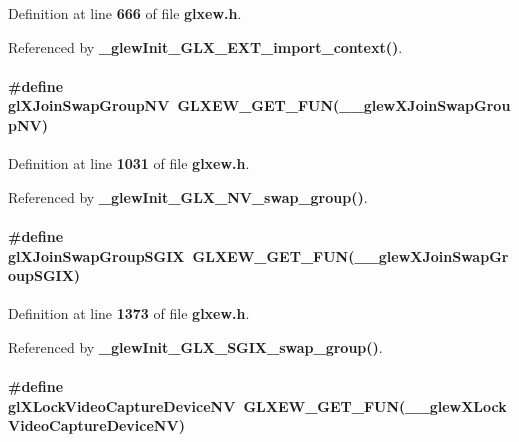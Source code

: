 Definition at line {\bf 666} of file {\bf glxew.\+h}.



Referenced by {\bf \+\_\+glew\+Init\+\_\+\+G\+L\+X\+\_\+\+E\+X\+T\+\_\+import\+\_\+context()}.

\paragraph[{gl\+X\+Join\+Swap\+Group\+NV}]{\setlength{\rightskip}{0pt plus 5cm}\#define gl\+X\+Join\+Swap\+Group\+NV~{\bf G\+L\+X\+E\+W\+\_\+\+G\+E\+T\+\_\+\+F\+UN}({\bf \+\_\+\+\_\+glew\+X\+Join\+Swap\+Group\+NV})}\label{glxew_8h_a625f3ace4ee49c8d56619e118e597ab9}


Definition at line {\bf 1031} of file {\bf glxew.\+h}.



Referenced by {\bf \+\_\+glew\+Init\+\_\+\+G\+L\+X\+\_\+\+N\+V\+\_\+swap\+\_\+group()}.

\paragraph[{gl\+X\+Join\+Swap\+Group\+S\+G\+IX}]{\setlength{\rightskip}{0pt plus 5cm}\#define gl\+X\+Join\+Swap\+Group\+S\+G\+IX~{\bf G\+L\+X\+E\+W\+\_\+\+G\+E\+T\+\_\+\+F\+UN}({\bf \+\_\+\+\_\+glew\+X\+Join\+Swap\+Group\+S\+G\+IX})}\label{glxew_8h_ac0ba60fc2b1d1c686c0cdaa4a08a9aff}


Definition at line {\bf 1373} of file {\bf glxew.\+h}.



Referenced by {\bf \+\_\+glew\+Init\+\_\+\+G\+L\+X\+\_\+\+S\+G\+I\+X\+\_\+swap\+\_\+group()}.

\paragraph[{gl\+X\+Lock\+Video\+Capture\+Device\+NV}]{\setlength{\rightskip}{0pt plus 5cm}\#define gl\+X\+Lock\+Video\+Capture\+Device\+NV~{\bf G\+L\+X\+E\+W\+\_\+\+G\+E\+T\+\_\+\+F\+UN}({\bf \+\_\+\+\_\+glew\+X\+Lock\+Video\+Capture\+Device\+NV})}\label{glxew_8h_a7de10f646df9c4ee5e80241beca81a28}


